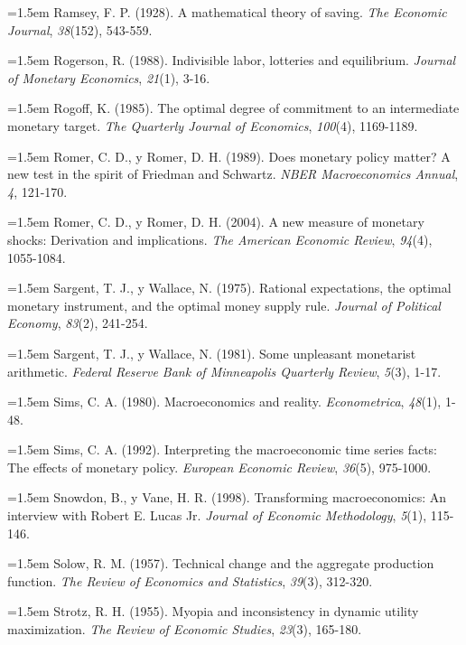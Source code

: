 \documentclass[10pt,a4paper]{article}
\begin{document}
\noindent\hangindent=1.5em Ramsey, F. P. (1928). A mathematical theory of saving. \textit{The Economic Journal}, \textit{38}(152), 543-559.

\noindent\hangindent=1.5em Rogerson, R. (1988). Indivisible labor, lotteries and equilibrium. \textit{Journal of Monetary Economics}, \textit{21}(1), 3-16.

\noindent\hangindent=1.5em Rogoff, K. (1985). The optimal degree of commitment to an intermediate monetary target. \textit{The Quarterly Journal of Economics}, \textit{100}(4), 1169-1189.

\noindent\hangindent=1.5em Romer, C. D., y Romer, D. H. (1989). Does monetary policy matter? A new test in the spirit of Friedman and Schwartz. \textit{NBER Macroeconomics Annual}, \textit{4}, 121-170.

\noindent\hangindent=1.5em Romer, C. D., y Romer, D. H. (2004). A new measure of monetary shocks: Derivation and implications. \textit{The American Economic Review}, \textit{94}(4), 1055-1084.

\noindent\hangindent=1.5em Sargent, T. J., y Wallace, N. (1975). Rational expectations, the optimal monetary instrument, and the optimal money supply rule. \textit{Journal of Political Economy}, \textit{83}(2), 241-254.

\noindent\hangindent=1.5em Sargent, T. J., y Wallace, N. (1981). Some unpleasant monetarist arithmetic. \textit{Federal Reserve Bank of Minneapolis Quarterly Review}, \textit{5}(3), 1-17.

\noindent\hangindent=1.5em Sims, C. A. (1980). Macroeconomics and reality. \textit{Econometrica}, \textit{48}(1), 1-48.

\noindent\hangindent=1.5em Sims, C. A. (1992). Interpreting the macroeconomic time series facts: The effects of monetary policy. \textit{European Economic Review}, \textit{36}(5), 975-1000.

\noindent\hangindent=1.5em Snowdon, B., y Vane, H. R. (1998). Transforming macroeconomics: An interview with Robert E. Lucas Jr. \textit{Journal of Economic Methodology}, \textit{5}(1), 115-146.

\noindent\hangindent=1.5em Solow, R. M. (1957). Technical change and the aggregate production function. \textit{The Review of Economics and Statistics}, \textit{39}(3), 312-320.

\noindent\hangindent=1.5em Strotz, R. H. (1955). Myopia and inconsistency in dynamic utility maximization. \textit{The Review of Economic Studies}, \textit{23}(3), 165-180.
\end{document}
